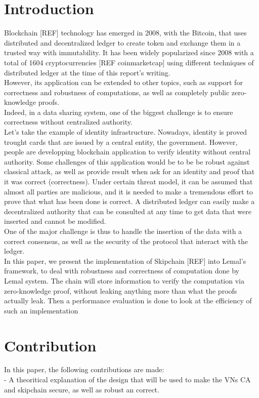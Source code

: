 \documentclass{article}
\begin{document}
\newpage

\tableofcontents

\newpage

\section{Introduction}
Blockchain [REF] technology has emerged in 2008, with the Bitcoin, that uses distributed and decentralized ledger to create token and exchange them in a trusted way with immutability.
It has been widely popularized since 2008 with a total of 1604 cryptocurrencies [REF coinmarketcap] using different techniques of distributed ledger at the time of this report's writing.\\
However, its application can be extended to other topics, such as support for correctness and robustness of computations, as well as completely public zero-knowledge proofs.\\
Indeed, in a data sharing system, one of the biggest challenge is to ensure correctness without centralized authority.\\
Let's take the example of identity infrastructure. Nowadays, identity is proved trought cards that are issued by a central entity, the government. However, people are developping blockchain application to verify identity without central authority. Some challenges of this application would be to be be robust against classical attack, as well as provide result when ask for an identity and proof that it was correct (correctness).
Under certain threat model, it can be assumed that almost all parties are malicious, and it is needed to make a tremendous effort to prove that what has been done is correct. A distributed ledger can easily make a decentralized authority that can be consulted at any time to get data that were inserted and cannot be modified.\\
One of the major challenge is thus to handle the insertion of the data with a correct consensus, as well as the security of the protocol that interact with the ledger.\\
In this paper, we present the implementation of Skipchain [REF] into Lemal's framework, to deal with robustness and correctness of computation done by Lemal system. The chain will store information to verify the computation via zero-knowledge proof, without leaking anything more than what the proofs actually leak. Then a performance evaluation is done to look at the efficiency of such an implementation


\section{Contribution}
In this paper, the following contributions are made:\\
- A theoritical explanation of the design that will be used to make the VNs CA and skipchain secure, as well as robust an correct.\\
\end{document}
